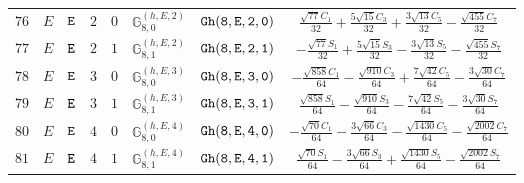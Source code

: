 \documentclass[fleqn,8pt]{jsarticle}
\begin{document}
\begin{table}[ht!]
\begin{center}
\begin{tabular}{cccccccc}
$ 76 $ & $ E $ & $ {\tt E} $ & $ 2 $ & $ 0 $ & $ \mathbb{G}_{8,0}^{(h,E,2)} $ & $ {\tt Gh(8,E,2,0)} $ & $ \frac{\sqrt{77} C_{1}}{32} + \frac{5 \sqrt{15} C_{3}}{32} + \frac{3 \sqrt{13} C_{5}}{32} - \frac{\sqrt{455} C_{7}}{32} $ \\
$ 77 $ & $ E $ & $ {\tt E} $ & $ 2 $ & $ 1 $ & $ \mathbb{G}_{8,1}^{(h,E,2)} $ & $ {\tt Gh(8,E,2,1)} $ & $ - \frac{\sqrt{77} S_{1}}{32} + \frac{5 \sqrt{15} S_{3}}{32} - \frac{3 \sqrt{13} S_{5}}{32} - \frac{\sqrt{455} S_{7}}{32} $ \\
$ 78 $ & $ E $ & $ {\tt E} $ & $ 3 $ & $ 0 $ & $ \mathbb{G}_{8,0}^{(h,E,3)} $ & $ {\tt Gh(8,E,3,0)} $ & $ - \frac{\sqrt{858} C_{1}}{64} - \frac{\sqrt{910} C_{3}}{64} + \frac{7 \sqrt{42} C_{5}}{64} - \frac{3 \sqrt{30} C_{7}}{64} $ \\
$ 79 $ & $ E $ & $ {\tt E} $ & $ 3 $ & $ 1 $ & $ \mathbb{G}_{8,1}^{(h,E,3)} $ & $ {\tt Gh(8,E,3,1)} $ & $ \frac{\sqrt{858} S_{1}}{64} - \frac{\sqrt{910} S_{3}}{64} - \frac{7 \sqrt{42} S_{5}}{64} - \frac{3 \sqrt{30} S_{7}}{64} $ \\
$ 80 $ & $ E $ & $ {\tt E} $ & $ 4 $ & $ 0 $ & $ \mathbb{G}_{8,0}^{(h,E,4)} $ & $ {\tt Gh(8,E,4,0)} $ & $ - \frac{\sqrt{70} C_{1}}{64} - \frac{3 \sqrt{66} C_{3}}{64} - \frac{\sqrt{1430} C_{5}}{64} - \frac{\sqrt{2002} C_{7}}{64} $ \\
$ 81 $ & $ E $ & $ {\tt E} $ & $ 4 $ & $ 1 $ & $ \mathbb{G}_{8,1}^{(h,E,4)} $ & $ {\tt Gh(8,E,4,1)} $ & $ \frac{\sqrt{70} S_{1}}{64} - \frac{3 \sqrt{66} S_{3}}{64} + \frac{\sqrt{1430} S_{5}}{64} - \frac{\sqrt{2002} S_{7}}{64} $ \\
 \hline \hline
\end{tabular}
\end{center}
\end{table}
\end{document}
